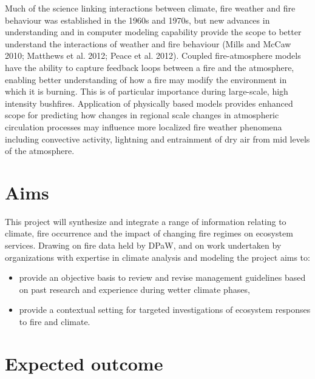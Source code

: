 \documentclass[version=last, paper=a4, DIV=18, usenames, dvipsnames]{scrartcl}
\begin{document}
Much of the science linking interactions between climate, fire weather and fire behaviour was established in the 1960s and 1970s, but new advances in understanding and in computer modeling capability provide the scope to better understand the interactions of weather and fire behaviour (Mills and McCaw 2010; Matthews et al. 2012; Peace et al. 2012). Coupled fire-atmosphere models have the ability to capture feedback loops between a fire and the atmosphere, enabling better understanding of how a fire may modify the environment in which it is burning. This is of particular importance during large-scale, high intensity bushfires. Application of physically based models provides enhanced scope for predicting how changes in regional scale changes in atmospheric circulation processes may influence more localized fire weather phenomena including convective activity, lightning and entrainment of dry air from mid levels of the atmosphere.






\section{Aims}



This project will synthesize and integrate a range of information relating to climate, fire occurrence and the impact of changing fire regimes on ecosystem services. Drawing on fire data held by DPaW, and on work undertaken by organizations with expertise in climate analysis and modeling the project aims to:


\begin{itemize}

  \item provide an objective basis to review and revise management guidelines based on past research and experience during wetter climate phases,

  \item provide a contextual setting for targeted investigations of ecosystem responses to fire and climate.

\end{itemize}






\section{Expected outcome}
\end{document}

